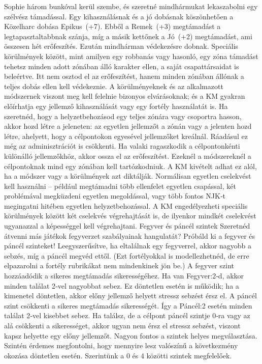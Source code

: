 \documentclass[oneside]{book}
\begin{document}
Sophie három bunkóval kerül szembe, és szeretné mindhármukat lekaszabolni egy szélvész támadással. Egy kihasználásnak és a jó dobásnak köszönhetően a Közelharc dobása Epikus~(+7). Ebből a Remek~(+3) megtámadást a legtapasztaltabbnak szánja, míg a másik kettőnek a Jó~(+2) megtámadást, ami összesen hét erőfeszítés. Ezután mindhárman védekezésre dobnak.
Speciális körülmények között, mint amilyen egy robbanás vagy hasonló, egy zóna támadást tehetsz minden adott zónában álló karakter ellen, a saját csapattársaidat is beleértve. Itt nem osztod el az erőfeszítést, hanem minden zónában állónak a teljes dobás ellen kell védekeznie. A körülményeknek és az alkalmazott módszernek viszont meg kell felelnie bizonyos elvárásoknak; és a KM gyakran előírhatja egy jellemző kihasználását vagy egy fortély használatát is.
Ha szeretnéd, hogy a helyzetbehozásod egy teljes zónára vagy csoportra hasson, akkor hozd létre a jeleneten: az egyetlen jellemzőt a zónán vagy a jelenten hozd létre, ahelyett, hogy a célpontokon egyesével jellemzőket kreálnál. Ráadásul ez még az adminisztrációt is csökkenti. Ha valaki ragaszkodik a célpontonkénti különálló jellemzőkhöz, akkor ossza el az erőfeszítést.
Ezeknél a módszereknél a célpontoknak mind egy zónában kell tartózkodniuk. A KM kivételt adhat ez alól, ha a módszer vagy a körülmények azt diktálják.
Normálisan egyetlen cselekvést kell használni – például megtámadni több ellenfelet egyetlen csapással, két problémával megküzdeni egyetlen megoldással, vagy több fontos NJK‑t megingatni hitében egyetlen helyzetbehozással. A KM engedélyezheti speciális körülmények között két cselekvés végrehajtását is, de ilyenkor mindkét cselekvést ugyanazzal a képességgel kell végrehajtani.
Fegyver és páncél szintek
Szeretnéd átvenni más játékok fegyverzet szabályainak hangulatát? Próbáld ki a fegyver és páncél szinteket! Leegyszerűsítve, ha eltalálnak egy fegyverrel, akkor nagyobb a sebzés, míg a páncél megvéd ettől. (Ezt fortélyokkal is modellezhetnéd, de erre elpazarolni a fortély rubrikákat nem mindenkinek jön be.)
A fegyver szint hozzáadódik a sikeres megtámadás sikerességéhez. Ha van Fegyver:2‑d, akkor minden találat 2‑vel nagyobbat sebez. Ez döntetlen esetén is működik; ha a kimenetel döntetlen, akkor előny jellemző helyett stressz sebzést érsz el.
A páncél szint csökkenti a sikeres megtámadás sikerességét. Így a Páncél:2 esetén minden találat 2‑vel kisebbet sebez. Ha találsz, de a célpont páncél szintje 0‑ra vagy az alá csökkenti a sikerességet, akkor ugyan nem érsz el stressz sebzést, viszont kapsz helyette egy előny jellemzőt.
Nagyon fontos a szintek helyes megválasztása. Szintén érdemes megfontolni, hogy mennyire lesz valószínű a következmény okozása döntetlen esetén. Szerintünk a 0 és 4 közötti szintek megfelelőek.
\end{document}
